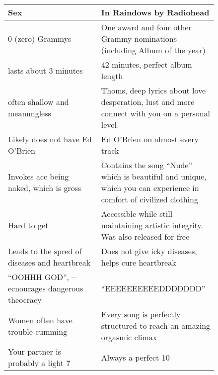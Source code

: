 \begin{table}[ht]
    \centering
    \begin{tabular}{p{0.42\linewidth}|p{0.42\linewidth}}
        \textbf{Sex} & \textbf{In Raindows} by \textbf{Radiohead} \\
        \hline
        $0$ (zero) Grammys & One award and four other Grammy nominations (including Album of the year) \\[2mm]
        lasts about 3 minutes & 42 minutes, perfect album length \\[2mm]
        often shallow and meanungless & Thoms, deep lyrics about love desperation, lust and more connect with you on a personal level \\[2mm]
        Likely does not have Ed O'Brien & Ed O'Brien on almost every track \\[2mm]
        Invokes acc being naked, which is gross & Contains the song ``Nude'' which is beautiful and unique, which you can experience in comfort of civilized clothing \\[2mm]
        Hard to get & Accessible while still maintaining artistic integrity. Was also released for free \\[2mm]
        Leads to the spred of diseases and heartbreak & Does not give icky diseases, helps cure heartbreak \\[2mm]
        ``OOHHH GOD'', -- ecnourages dangerous theocracy & ``EEEEEEEEEEDDDDDDD'' \\[2mm]
        Women often have trouble cumming & Every song is perfectly structured to reach an amazing orgasmic climax \\[2mm]
        Your partner is probably a light 7 & Always a perfect 10
    \end{tabular}
    \label{tab:sex}
\end{table}